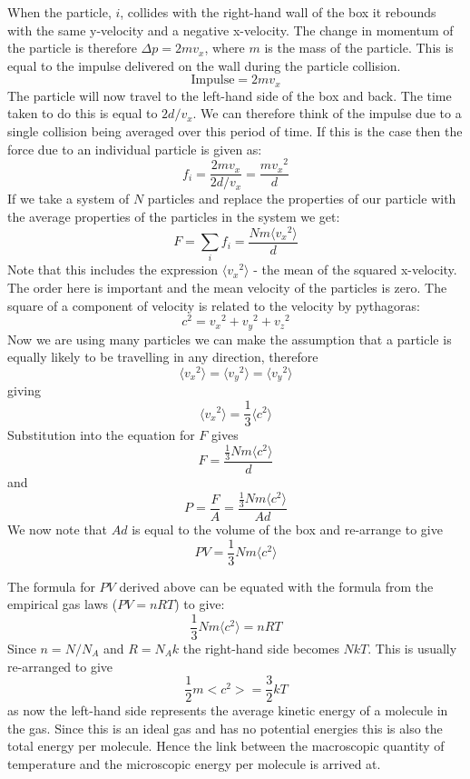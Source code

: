 \documentclass[main.tex]{subfiles}
\begin{document}
When the particle, $i$,  collides with the right-hand wall of the box it rebounds with the same y-velocity and a negative x-velocity. The change in momentum of the particle is therefore $ \Delta p = 2mv_x $, where $m$ is the mass of the particle. This is equal to the impulse delivered on the wall during the particle collision.
$$ \text{Impulse} = 2mv_x $$
The particle will now travel to the left-hand side of the box and back. The time taken to do this is equal to $2d/v_x$. We can therefore think of the impulse due to a single collision being averaged over this period of time. If this is the case then the force due to an individual particle is given as:
\[ f_i = \frac{2mv_x}{2d/v_x} = \frac{m{v_x}^2}{d}\]
If we take a system of $N$ particles and replace the properties of our particle with the average properties of the particles in the system we get:
\[ F = \sum_i f_i = \frac{Nm\langle{v_x}^2\rangle}{d}\]
Note that this includes the expression $\langle{v_x}^2\rangle$ - the mean of the squared x-velocity. The order here is important and the mean velocity of the particles is zero. The square of a component of velocity is related to the velocity by pythagoras:
\[ c^2 = {v_x}^2 + {v_y}^2 + {v_z}^2\]
Now we are using many particles we can make the assumption that a particle is equally likely to be travelling in any direction, therefore 
\[ \langle{v_x}^2\rangle = \langle{v_y}^2\rangle = \langle{v_y}^2\rangle \]
giving
\[ \langle{v_x}^2\rangle = \frac{1}{3}\langle c^2 \rangle \]
Substitution into the equation for $F$ gives
\[ F = \frac{\frac{1}{3}Nm\langle c^2\rangle}{d} \]
and
\[ P = \frac{F}{A} = \frac{\frac{1}{3}Nm\langle c^2\rangle}{Ad} \]
We now note that $Ad$ is equal to the volume of the box and re-arrange to give
\[ PV = \frac{1}{3}Nm\langle c^2\rangle \]




The formula for $PV$ derived above can be equated with the formula from the empirical gas laws ($PV=nRT$) to give:
\[  \frac{1}{3}Nm\langle c^2\rangle = nRT \]
Since $n = N / N_A $ and $ R = N_A k $ the right-hand side becomes $NkT$. This is usually re-arranged to give
\[ \frac{1}{2}m<c^2> = \frac{3}{2}kT \]
as now the left-hand side represents the average kinetic energy of a molecule in the gas. Since this is an ideal gas and has no potential energies this is also the total energy per molecule. Hence the link between the macroscopic quantity of temperature and the microscopic energy per molecule is arrived at.
\end{document}

